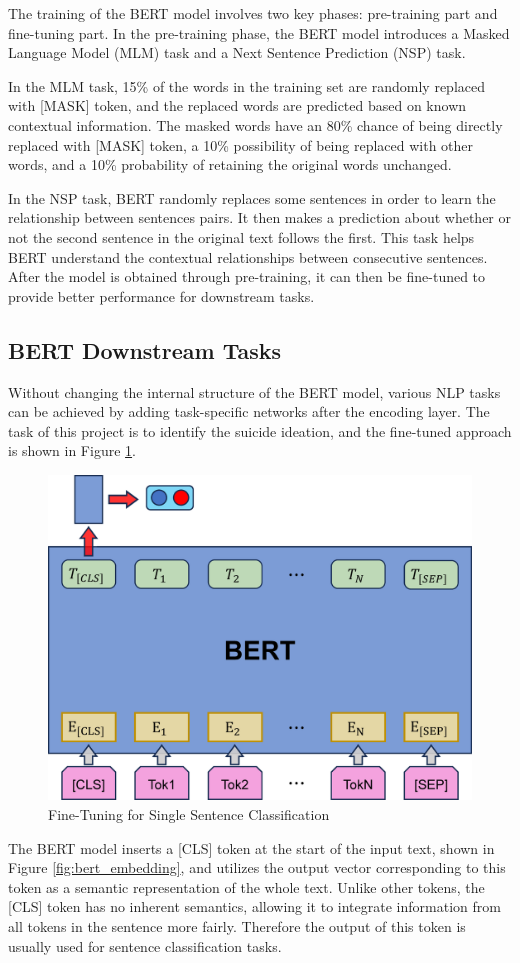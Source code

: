 \documentclass[ %
                    author={Bocheng Wang},
                supervisor={Dr. Qiang Liu},
                    degree={MSc},
                     title={A Research on Identification of Suicide Ideation in Texts with Multiple Models},
                      type={},
                      year={2024}]{dissertation}
\begin{document}
The training of the BERT model involves two key phases: pre-training part and fine-tuning part. In the pre-training phase, the BERT model introduces a Masked Language Model (MLM) task and a Next Sentence Prediction (NSP) task. 

In the MLM task, 15\% of the words in the training set are randomly replaced with [MASK] token, and the replaced words are predicted based on known contextual information. The masked words have an 80\% chance of being directly replaced with [MASK] token, a 10\% possibility of being replaced with other words, and a 10\% probability of retaining the original words unchanged. 

In the NSP task, BERT randomly replaces some sentences in order to learn the relationship between sentences pairs. It then makes a prediction about whether or not the second sentence in the original text follows the first. This task helps BERT understand the contextual relationships between consecutive sentences. After the model is obtained through pre-training, it can then be fine-tuned to provide better performance for downstream tasks.

\subsection{BERT Downstream Tasks}
\noindent
Without changing the internal structure of the BERT model, various NLP tasks can be achieved by adding task-specific networks after the encoding layer. The task of this project is to identify the suicide ideation, and the fine-tuned approach is shown in Figure \ref{fig:bfsc}. 

\begin{figure}[h]
      \centering
      \includegraphics[width=0.5\linewidth]{../img/bfsc.eps}
      \caption{Fine-Tuning for Single Sentence Classification}
      \label{fig:bfsc}
\end{figure}

The BERT model inserts a [CLS] token at the start of the input text, shown in Figure \ref{fig:bert_embedding}, and utilizes the output vector corresponding to this token as a semantic representation of the whole text. Unlike other tokens, the [CLS] token has no inherent semantics, allowing it to integrate information from all tokens in the sentence more fairly. Therefore the output of this token is usually used for sentence classification tasks.
\end{document}
